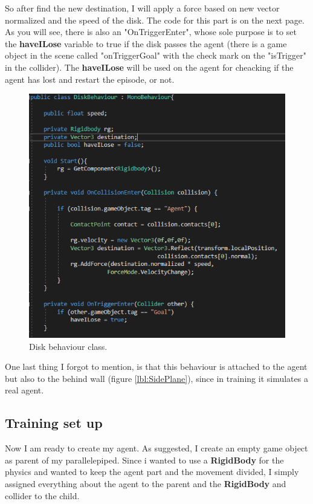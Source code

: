 \documentclass[12pt]{article}
\begin{document}
	\noindent
	So after find the new destination, I will apply a force based on new vector normalized and the speed of the disk.
	The code for this part is on the next page. As you will see, there is also an "OnTriggerEnter", whose sole purpose is to set the \textbf{haveILose} variable to true if the disk passes the agent (there is a game object in the scene called "onTriggerGoal" with the check mark on the "isTrigger" in the collider). The  \textbf{haveILose} will be used on the agent for cheacking if the agent has lost and restart the episode, or not.
	
	\newpage
	
	\begin{figure}[hbt!]
		\centering
		\includegraphics[width= 1
		\textwidth]{images/DiskBehaviour1.png}
		\caption{Disk behaviour class.}
		\label{lbl:reflect}
	\end{figure} 
	
	\noindent
	One last thing I forgot to mention, is that this behaviour is attached to the agent but also to the behind wall (figure \ref{lbl:SidePlane}), since in training it simulates a real agent.
	
	\subsection{Training set up}
	Now I am ready to create my agent. As suggested, I create an empty game object as parent of my parallelepiped. Since i wanted to use a \textbf{RigidBody} for the physics and wanted to keep the agent part and the movement divided,  I simply assigned everything about the agent to the parent and the \textbf{RigidBody} and collider to the child.  
	
\end{document}
